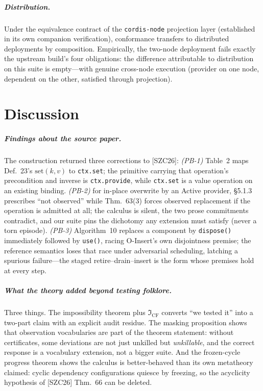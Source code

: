 \documentclass[sigplan,screen,review,nonacm]{acmart}
\newcommand{\CF}{\ensuremath{\mathfrak I_{\mathrm{CF}}}}
\newcommand{\SZC}{[SZC26]}
\begin{document}
\subparagraph{Distribution.} Under the equivalence contract of the
\texttt{cordis-node} projection layer (established in its own companion
verification), conformance transfers to distributed deployments by
composition. Empirically, the two-node deployment fails exactly the upstream
build's four obligations: the difference attributable to distribution on this
suite is empty---with genuine cross-node execution (provider on one node,
dependent on the other, satisfied through projection).

\section{Discussion}\label{sec:discussion}

\subparagraph{Findings about the source paper.} The construction returned
three corrections to \SZC{}: \emph{(PB-1)} Table~2 maps Def.~23's
$\mathrm{set}(k,v)$ to \texttt{ctx.set}; the primitive carrying that
operation's precondition and inverse is \texttt{ctx.provide}, while
\texttt{ctx.set} is a value operation on an existing binding.
\emph{(PB-2)} for in-place overwrite by an Active provider, \S5.1.3 prescribes
``not observed'' while Thm.~63(3) forces observed replacement if the operation
is admitted at all; the calculus is silent, the two prose commitments
contradict, and our suite pins the dichotomy any extension must satisfy (never
a torn episode). \emph{(PB-3)} Algorithm~10 replaces a component by
\texttt{dispose()} immediately followed by \texttt{use()}, racing
O\mbox{-}Insert's own disjointness premise; the reference semantics loses that
race under adversarial scheduling, latching a spurious failure---the staged
retire--drain--insert is the form whose premises hold at every step.

\subparagraph{What the theory added beyond testing folklore.} Three things.
The impossibility theorem plus \CF{} converts ``we tested it'' into a
two-part claim with an explicit audit residue. The masking proposition shows
that observation vocabularies are part of the theorem statement: without
certificates, some deviations are not just unkilled but \emph{unkillable}, and
the correct response is a vocabulary extension, not a bigger suite. And the
frozen-cycle progress theorem shows the calculus is better-behaved than its
own metatheory claimed: cyclic dependency configurations quiesce by freezing,
so the acyclicity hypothesis of \SZC{} Thm.~66 can be deleted.
\end{document}
